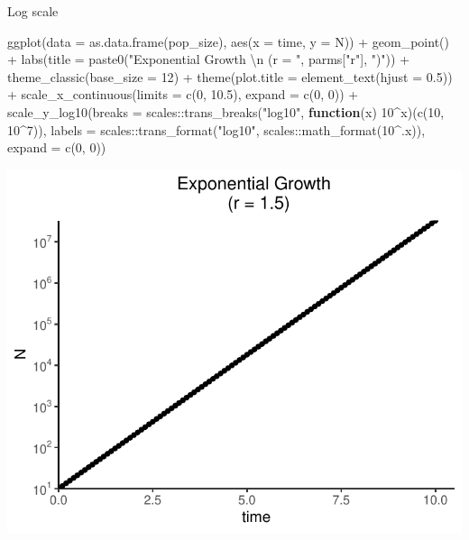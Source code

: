 \documentclass[
]{book}
\newenvironment{Shaded}{\begin{snugshade}}{\end{snugshade}}
\newcommand{\AttributeTok}[1]{\textcolor[rgb]{0.77,0.63,0.00}{#1}}
\newcommand{\ControlFlowTok}[1]{\textcolor[rgb]{0.13,0.29,0.53}{\textbf{#1}}}
\newcommand{\DecValTok}[1]{\textcolor[rgb]{0.00,0.00,0.81}{#1}}
\newcommand{\FloatTok}[1]{\textcolor[rgb]{0.00,0.00,0.81}{#1}}
\newcommand{\FunctionTok}[1]{\textcolor[rgb]{0.00,0.00,0.00}{#1}}
\newcommand{\NormalTok}[1]{#1}
\newcommand{\SpecialCharTok}[1]{\textcolor[rgb]{0.00,0.00,0.00}{#1}}
\newcommand{\StringTok}[1]{\textcolor[rgb]{0.31,0.60,0.02}{#1}}
\begin{document}
Log scale

\begin{Shaded}
\begin{Highlighting}[]
\FunctionTok{ggplot}\NormalTok{(}\AttributeTok{data =} \FunctionTok{as.data.frame}\NormalTok{(pop\_size), }\FunctionTok{aes}\NormalTok{(}\AttributeTok{x =}\NormalTok{ time, }\AttributeTok{y =}\NormalTok{ N)) }\SpecialCharTok{+} 
  \FunctionTok{geom\_point}\NormalTok{() }\SpecialCharTok{+} 
  \FunctionTok{labs}\NormalTok{(}\AttributeTok{title =} \FunctionTok{paste0}\NormalTok{(}\StringTok{"Exponential Growth }\SpecialCharTok{\textbackslash{}n}\StringTok{ (r = "}\NormalTok{, parms[}\StringTok{"r"}\NormalTok{], }\StringTok{")"}\NormalTok{)) }\SpecialCharTok{+}
  \FunctionTok{theme\_classic}\NormalTok{(}\AttributeTok{base\_size =} \DecValTok{12}\NormalTok{) }\SpecialCharTok{+} 
  \FunctionTok{theme}\NormalTok{(}\AttributeTok{plot.title =} \FunctionTok{element\_text}\NormalTok{(}\AttributeTok{hjust =} \FloatTok{0.5}\NormalTok{)) }\SpecialCharTok{+} 
  \FunctionTok{scale\_x\_continuous}\NormalTok{(}\AttributeTok{limits =} \FunctionTok{c}\NormalTok{(}\DecValTok{0}\NormalTok{, }\FloatTok{10.5}\NormalTok{), }\AttributeTok{expand =} \FunctionTok{c}\NormalTok{(}\DecValTok{0}\NormalTok{, }\DecValTok{0}\NormalTok{)) }\SpecialCharTok{+}
  \FunctionTok{scale\_y\_log10}\NormalTok{(}\AttributeTok{breaks =}\NormalTok{ scales}\SpecialCharTok{::}\FunctionTok{trans\_breaks}\NormalTok{(}\StringTok{"log10"}\NormalTok{, }\ControlFlowTok{function}\NormalTok{(x) }\DecValTok{10}\SpecialCharTok{\^{}}\NormalTok{x)(}\FunctionTok{c}\NormalTok{(}\DecValTok{10}\NormalTok{, }\DecValTok{10}\SpecialCharTok{\^{}}\DecValTok{7}\NormalTok{)),}
                \AttributeTok{labels =}\NormalTok{ scales}\SpecialCharTok{::}\FunctionTok{trans\_format}\NormalTok{(}\StringTok{"log10"}\NormalTok{, scales}\SpecialCharTok{::}\FunctionTok{math\_format}\NormalTok{(}\DecValTok{10}\SpecialCharTok{\^{}}\NormalTok{.x)),}
                \AttributeTok{expand =} \FunctionTok{c}\NormalTok{(}\DecValTok{0}\NormalTok{, }\DecValTok{0}\NormalTok{))}
\end{Highlighting}
\end{Shaded}

\begin{center}\includegraphics[width=0.7\linewidth]{02_Week_2_files/figure-latex/unnamed-chunk-3-1} \end{center}
\end{document}

